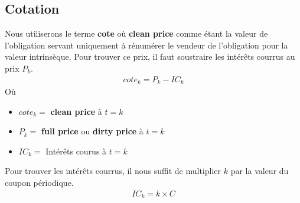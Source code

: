 \documentclass[12pt]{article}
\begin{document}
\subsection{Cotation}
Nous utiliserons le terme \textbf{cote} où \textbf{clean price} comme étant la valeur de l'obligation servant uniquement à rénumérer le vendeur de l'obligation pour la valeur intrinsèque. Pour trouver  ce prix, il faut soustraire les intérêts courrus au prix $P_k$.
\begin{align*}
cote_k=P_k-IC_k
\end{align*}
Où
\begin{itemize}
\item $cote_k=$ \textbf{clean price} à $t=k$
\item $P_k=$ \textbf{full price} ou \textbf{dirty price} à $t=k$
\item $IC_k=$ Intérêts courus à $t=k$
\end{itemize}

Pour trouver les intérêts courrus, il nous suffit de multiplier $k$ par la valeur du coupon périodique.
\begin{align*}
IC_k= k \times C
\end{align*}
\end{document}
